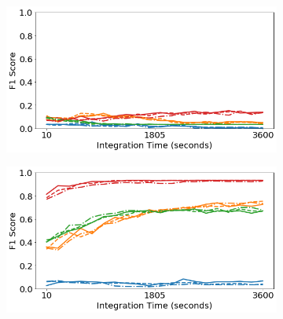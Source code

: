 \begin{figure}[H]
     \centering
     \begin{subfigure}[b]{0.49\textwidth}
         \centering
         \includegraphics[width=\textwidth]{images/generalization-fwhm-aug-easy-01.png}
         \caption{}
         \label{fig:generalization-fwhm-aug-easy-01}
     \end{subfigure}
     \hfill
     \begin{subfigure}[b]{0.49\textwidth}
         \centering
         \includegraphics[width=\textwidth]{images/generalization-fwhm-aug-easy-05.png}
         \caption{}
         \label{fig:generalization-fwhm-aug-easy-05}
     \end{subfigure}


\end{figure}
